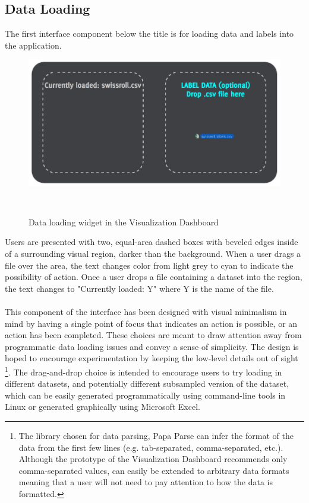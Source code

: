 \documentclass{sigchi}
\begin{document}
\subsection{Data Loading}
The first interface component below the title is for loading data and labels into the application. %
%
\begin{figure}
  \centering
  \includegraphics[width=.99\columnwidth]{figures/data_load}
  \caption{Data loading widget in the Visualization Dashboard}~\label{fig:figure2}
\end{figure}
%
Users are presented with two, equal-area dashed boxes with beveled edges inside of a surrounding visual region, darker than the background. %
%
When a user drags a file over the area, the text changes color from light grey to cyan to indicate the possibility of action. %
%
Once a user drops a file containing a dataset into the region, the text changes to "Currently loaded: Y" where Y is the name of the file. %
%
\\\\
%
This component of the interface has been designed with visual minimalism in mind by having a single point of focus that indicates an action is possible, or an action has been completed. %
%
These choices are meant to draw attention away from programmatic data loading issues and convey a sense of simplicity. %
%
The design is hoped to encourage experimentation by keeping the low-level details out of sight%
%
\footnote{The library chosen for data parsing, Papa Parse \cite{papaparse} can infer the format of the data from the first few lines (e.g. tab-separated, comma-separated, etc.). %
%
Although the prototype of the Visualization Dashboard recommends only comma-separated values, \cite{papaparse} can easily be extended to arbitrary data formats meaning that a user will not need to pay attention to how the data is formatted.}. %
%
The drag-and-drop choice is intended to encourage users to try loading in different datasets, and potentially different subsampled version of the dataset, which can be easily generated programmatically using command-line tools in Linux or generated graphically using Microsoft Excel. %
%
%
\end{document}
